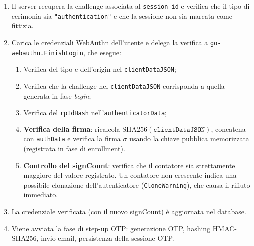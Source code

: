 \begin{enumerate}
  \item Il server recupera la challenge associata al \texttt{session\_id}
    e verifica che il tipo di cerimonia sia \texttt{"authentication"} e
    che la sessione non sia marcata come fittizia.

  \item Carica le credenziali WebAuthn dell'utente e delega la verifica
    a \texttt{go-webauthn.FinishLogin}, che esegue:
    \begin{enumerate}
      \item Verifica del tipo e dell'origin nel \texttt{clientDataJSON};
      \item Verifica che la challenge nel \texttt{clientDataJSON}
        corrisponda a quella generata in fase \emph{begin};
      \item Verifica del \texttt{rpIdHash} nell'\texttt{authenticatorData};
      \item \textbf{Verifica della firma}: ricalcola
        $\mathrm{SHA256}(\texttt{clientDataJSON})$,
        concatena con \texttt{authData} e verifica la firma
        $\sigma$ usando la chiave pubblica memorizzata (registrata
        in fase di enrollment).
      \item \textbf{Controllo del signCount}: verifica che il contatore
        sia strettamente maggiore del valore registrato. Un contatore
        non crescente indica una possibile clonazione dell'autenticatore
        (\texttt{CloneWarning}), che causa il rifiuto immediato.
    \end{enumerate}

  \item La credenziale verificata (con il nuovo signCount) è aggiornata
    nel database.

  \item Viene avviata la fase di step-up OTP: generazione OTP,
    hashing HMAC-SHA256, invio email, persistenza della sessione OTP.
\end{enumerate}

